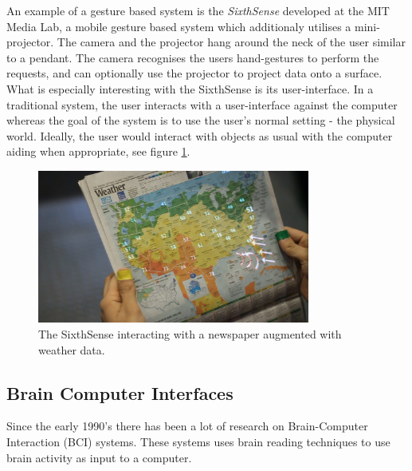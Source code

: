 An example of a gesture based system is the \emph{SixthSense} developed at the MIT Media Lab, a mobile gesture based system which additionaly utilises a mini-projector. The camera and the projector hang around the neck of the user similar to a pendant. The camera recognises the users hand-gestures to perform the requests, and can optionally use the projector to project data onto a surface. What is especially interesting with the SixthSense is its user-interface. In a traditional system, the user interacts with a user-interface against the computer whereas the goal of the system is to use the user's normal setting - the physical world\cite{Mistry:2009:SWG:1667146.1667160}. Ideally, the user would interact with objects as usual with the computer aiding when appropriate, see figure \ref{sixthsense}.


\begin{figure}[]
\includegraphics[width=0.8\textwidth] {bilder/newspaper.jpg}
\caption{The SixthSense interacting with a newspaper augmented with weather data.}
\label{sixthsense}
\end{figure}
\nocite{newspaper}


\subsection{Brain Computer Interfaces}

Since the early 1990's there has been a lot of research on Brain-Computer Interaction (BCI) systems. These systems uses brain reading techniques to use brain activity as input to a computer. 

